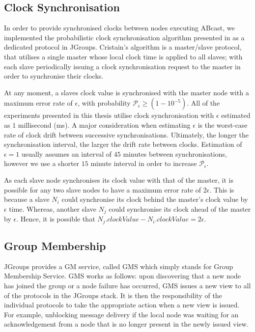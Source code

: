 	\subsection{Clock Synchronisation}\label{ssec:clocksynch}
	In order to provide synchronised clocks between nodes executing \textsf{ABcast}, we implemented the probabilistic clock synchronisation algorithm presented in \citep{Cristian:1996:SA:227210.227231} as a dedicated protocol in JGroups.  Cristain's algorithm is a master/slave protocol, that utilises a single master whose local clock time is applied to all slaves; with each slave periodically issuing a clock synchronisation request to the master in order to synchronise their clocks.  
			
			At any moment, a slaves clock value is synchronised with the master node with a maximum error rate of $\epsilon$, with probability $\mathcal{P}_\epsilon \geq (1- 10^{-5})$. All of the experiments presented in this thesis utilise clock synchronisation with $\epsilon$ estimated as $1$ millisecond (ms).  A major consideration when estimating $\epsilon$ is the worst-case rate of clock drift between successive synchronisations. Ultimately, the longer the synchronisation interval, the larger the drift rate between clocks.  Estimation of $\epsilon = 1$ usually assumes an interval of $45$ minutes between synchronisations, however we use a shorter $15$ minute interval in order to increase $\mathcal{P}_\epsilon$.
			
			As each slave node synchronises its clock value with that of the master, it is possible for any two slave nodes to have a maximum error rate of $2\epsilon$.  This is because a slave $N_i$ could synchronise its clock behind the master's clock value by $\epsilon$ time.  Whereas, another slave $N_j$ could synchronise its clock ahead of the master by $\epsilon$. Hence, it is possible that $N_j.clockValue - N_i.clockValue = 2\epsilon$.  

    \subsection{Group Membership}\label{ssec:jgroups_gm}
	JGroups provides a GM service, called GMS which simply stands for Group Membership Service. GMS works as follows: upon discovering that a new node has joined the group or a node failure has occurred, GMS issues a new view to all of the protocols in the JGroups stack.  It is then the responsibility of the individual protocols to take the appropriate action when a new view is issued.  For example, unblocking message delivery if the local node was waiting for an acknowledgement from a node that is no longer present in the newly issued view.  	
	

